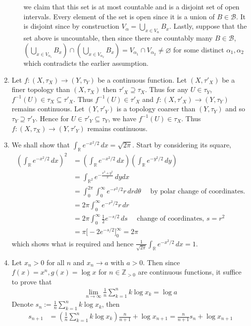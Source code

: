 \documentclass[a4paper,12pt]{article}
\theoremstyle{definition}
\begin{document}
\begin{enumerate}
\begin{enumerate}
we claim that this set is at most countable and is a disjoint set of open intervals. Every element of the set is open since it is a union of $B \in \mathcal{B}$. It is disjoint since by construction $V_\alpha = \bigcup_{x\in V_\alpha} B_x$. Lastly, suppose that the set above is uncountable, then since there are countably many $B \in \mathcal{B}$, $\left(\bigcup_{x\in V_{\alpha_1}}B_x\right) \cap \left(\bigcup_{x\in V_{\alpha_2}}B_x\right)  = V_{\alpha_1} \cap V_{\alpha_2} \neq \varnothing$ for some distinct $\alpha_1, \alpha_2$ which contradicts the earlier assumption.

\end{enumerate}

\item Let $f : (X, \tau_X) \to (Y, \tau_Y)$ be a continuous function. Let $(X,\tau'_X)$ be a finer topology than $(X, \tau_X)$ then $\tau'_X \supseteq \tau_X$. Thus for any $U \in \tau_Y$, $f^{-1}(U) \in \tau_X \subseteq \tau'_X$. Thus $f^{-1}(U) \in \tau'_X$ and $f : (X, \tau'_X) \to (Y, \tau_Y)$ remains continuous. Let $(Y,\tau'_Y)$ is a topology coarser than $(Y, \tau_Y)$ and so $\tau_Y \supseteq\tau'_Y$. Hence for $U \in \tau'_Y \subseteq \tau_Y$, we have $f^{-1}(U)\in \tau_X$. Thus  $f : (X, \tau_X) \to (Y, \tau'_Y)$ remains continuous.

\item We shall show that $\int_{\mathbb{R}}e^{-x^2/2}\,dx = \sqrt{2\pi}$. Start by considering its square,
\begin{align*}
\left(\int_{\mathbb{R}}e^{-x^2/2}\,dx\right)^2 &= \left(\int_{\mathbb{R}}e^{-x^2/2}\,dx\right)\left(\int_{\mathbb{R}}e^{-y^2/2}\,dy\right)\\
&=\int_{\mathbb{R}^2}e^{-\frac{x^2+y^2}{2}}\,dydx\\
& = \int_{0}^{2\pi}\int_{0}^{\infty}e^{-r^2/2}r \,drd\theta \quad\text{   by polar change of coordinates.}\\
&= 2\pi \int_{0}^{\infty}e^{-r^2/2}r \,dr \\
&=2\pi \int_{0}^{\infty}\frac{1}{2}e^{-s/2} \,ds\quad \text{ change of coordinates, $s = r^2$}\\
&=\pi \Big[-2e^{-s/2}\Big]_{0}^{\infty} = 2\pi
\end{align*}
which shows what is required and hence $\frac{1}{\sqrt{2\pi}}\int_{\mathbb{R}}e^{-x^2/2}\,dx=1$.



\item Let $x_n >0$ for all $n$ and $x_n \to a$ with $a >0$. Then since $f(x) =  x^n, g(x) = \log x$ for $n \in \mathbb{Z}_{>0}$ are continuous functions, it suffice to prove that 
\begin{align*}
\lim_{n\to \infty}\frac{1}{n}\sum_{k=1}^{n}k\log x_k = \log a
\end{align*}
Denote $s_n:=\frac{1}{n}\sum_{k=1}^{n}k\log x_k$, then
\begin{align*}
s_{n+1} &= \left(\frac{1}{n}\sum_{k=1}^{n}k\log x_k\right)\frac{n}{n+1}+\log x_{n+1}= \frac{n}{n+1}s_n+\log x_{n+1}
\end{align*}



\end{enumerate}
\end{document}
